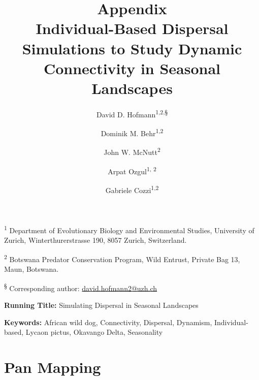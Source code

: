 \documentclass[abstract=on,10pt,a4paper,bibliography=totocnumbered]{article}
\title{\textbf{Appendix}\\ Individual-Based Dispersal Simulations to Study
Dynamic Connectivity in Seasonal Landscapes}
\author{
  David D. Hofmann\textsuperscript{1,2,\S} \orcid{0000-0003-3477-4365} \and
  Dominik M. Behr\textsuperscript{1,2} \orcid{0000-0001-7378-8538} \and
  John W. McNutt\textsuperscript{2} \and
  Arpat Ozgul\textsuperscript{1, 2} \orcid{0000-0001-7477-2642} \and
  Gabriele Cozzi\textsuperscript{1,2} \orcid{0000-0002-1744-1940}
}
\renewcommand{\theequation}{Equation \arabic{equation}}%
\newcommand{\beginappendix}{%
  \setcounter{table}{0}
  \renewcommand{\thetable}{S\arabic{table}}%
  \setcounter{figure}{0}
  \renewcommand{\thefigure}{S\arabic{figure}}%
  \setcounter{equation}{0}
  \renewcommand{\theequation}{Equation S\arabic{equation}}%
  \setcounter{section}{0}
  \renewcommand{\thesection}{A.\arabic{section}}%
}
\begin{document}

\maketitle

\begin{flushleft}

\vspace{0.5cm}

\textsuperscript{1} Department of Evolutionary Biology and Environmental
Studies, University of Zurich, Winterthurerstrasse 190, 8057 Zurich,
Switzerland.

\textsuperscript{2} Botswana Predator Conservation Program, Wild Entrust,
Private Bag 13, Maun, Botswana.

\textsuperscript{\S} Corresponding author: \href{mailto://david.hofmann2@uzh.ch}{david.hofmann2@uzh.ch}

\vspace{4cm}

\textbf{Running Title:} Simulating Dispersal in Seasonal Landscapes

\vspace{0.5cm}

\textbf{Keywords:} African wild dog, Connectivity, Dispersal, Dynamism,
Individual-based, Lycaon pictus, Okavango Delta, Seasonality

\end{flushleft}

\newpage

\onehalfspacing
\tableofcontents
\doublespacing



\appendix
\beginappendix

\newpage
\section{Pan Mapping}
\end{document}
